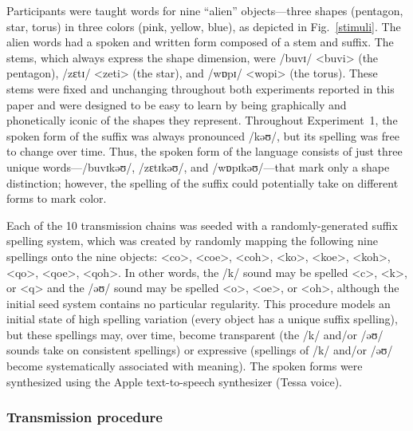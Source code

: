 \documentclass[doc,biblatex]{apa7}
\begin{document}
Participants were taught words for nine ``alien'' objects---three shapes (pentagon, star, torus) in three colors (pink, yellow, blue), as depicted in Fig.~\ref{stimuli}. The alien words had a spoken and written form composed of a stem and suffix. The stems, which always express the shape dimension, were /buvɪ/ <buvi> (the pentagon), /zɛtɪ/ <zeti> (the star), and /wɒpɪ/ <wopi> (the torus). These stems were fixed and unchanging throughout both experiments reported in this paper and were designed to be easy to learn by being graphically and phonetically iconic of the shapes they represent. Throughout Experiment~1, the spoken form of the suffix was always pronounced /kəʊ/, but its spelling was free to change over time. Thus, the spoken form of the language consists of just three unique words---/buvɪkəʊ/, /zɛtɪkəʊ/, and /wɒpɪkəʊ/---that mark only a shape distinction; however, the spelling of the suffix could potentially take on different forms to mark color.

Each of the 10 transmission chains was seeded with a randomly-generated suffix spelling system, which was created by randomly mapping the following nine spellings onto the nine objects: <co>, <coe>, <coh>, <ko>, <koe>, <koh>, <qo>, <qoe>, <qoh>. In other words, the /k/ sound may be spelled <c>, <k>, or <q> and the /əʊ/ sound may be spelled <o>, <oe>, or <oh>, although the initial seed system contains no particular regularity. This procedure models an initial state of high spelling variation (every object has a unique suffix spelling), but these spellings may, over time, become transparent (the /k/ and/or /əʊ/ sounds take on consistent spellings) or expressive (spellings of /k/ and/or /əʊ/ become systematically associated with meaning). The spoken forms were synthesized using the Apple text-to-speech synthesizer (Tessa voice).

\subsubsection{Transmission procedure}
\end{document}
